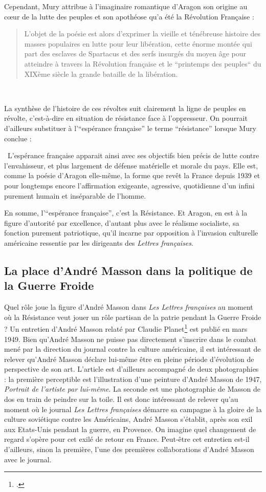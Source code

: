 Cependant, Mury attribue à l’imaginaire romantique d’Aragon son origine au c\oe{}ur de la lutte des peuples et son apothéose qu’a été la Révolution Française : 

\begin{quote}
 L’objet de la poésie est alors d’exprimer la vieille et ténébreuse histoire des masses populaires en lutte pour leur libération, cette énorme montée qui part des esclaves de Spartacus et des serfs insurgés du moyen âge pour atteindre à travers la Révolution française et le “printemps des peuples“ du XIXème siècle la grande bataille de la libération.   
\end{quote} 

 La synthèse de l’histoire de ces révoltes suit clairement la ligne de peuples en révolte, c’est-à-dire en situation de résistance face à l’oppresseur. On pourrait d’ailleurs substituer à l’\enquote{espérance française} le terme \enquote{résistance} lorsque Mury conclue : 

 L’espérance française apparait ainsi avec ses objectifs bien précis de lutte contre l’envahisseur, et plus largement de défense matérielle et morale du pays. Elle est, comme la poésie d’Aragon elle-même, la forme que revêt la France depuis 1939 et pour longtemps encore l’affirmation exigeante, agressive, quotidienne d’un infini purement humain et inséparable de l’homme.

	 En somme, l’\enquote{espérance française}, c’est la Résistance. Et Aragon, en est à la figure d’autorité par excellence, d’autant plus avec le réalisme socialiste, sa fonction purement patriotique, qu’il incarne par opposition à l’invasion culturelle américaine ressentie par les dirigeants des \emph{Lettres françaises}. 
\subsection{La place d'André Masson dans la politique de la Guerre Froide}

     Quel rôle joue la figure d’André Masson dans \emph{Les Lettres françaises} au moment où la Résistance veut jouer un rôle partisan de la patrie pendant la Guerre Froide ? Un entretien d’André Masson relaté par Claudie Planet\footcite{entretienmasson} est publié en mars 1949. Bien qu’André Masson ne puisse pas directement s’inscrire dans le combat mené par la direction du journal contre la culture américaine, il est intéressant de relever qu’André Masson déclare lui-même être en pleine période d’évolution de perspective de son art. L’article est d’ailleurs accompagné de deux photographies : la première perceptible est l’illustration d’une peinture d’André Masson de 1947, \emph{Portrait de l’artiste par lui-même}. La seconde est une photographie de Masson de dos en train de peindre sur la toile. Il est donc intéressant de relever qu’au moment où le journal \emph{Les Lettres françaises} démarre sa campagne à la gloire de la culture soviétique contre les Américains, André Masson s’établit, après son exil aux Etats-Unis pendant la guerre, en Provence. On imagine quel changement de regard s’opère pour cet exilé de retour en France. Peut-être cet entretien est-il d’ailleurs, sinon la première, l’une des premières collaborations d’André Masson avec le journal.
	 
